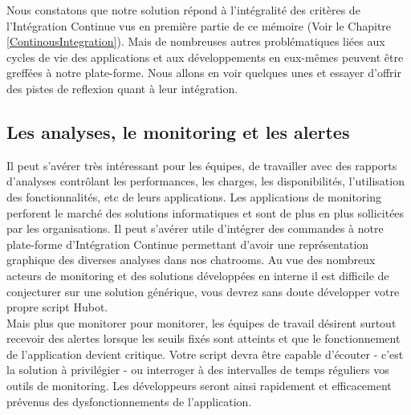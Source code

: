       Nous constatons que notre solution répond à l'intégralité des critères de l'Intégration Continue vus en première partie de ce mémoire (Voir le Chapitre \ref{ContinousIntegration}). Mais de nombreuses autres problématiques liées aux cycles de vie des applications et aux développements en eux-mêmes peuvent être greffées à notre plate-forme. Nous allons en voir quelques unes et essayer d'offrir des pistes de reflexion quant à leur intégration.

      \subsection{Les analyses, le monitoring et les alertes}
      Il peut s'avérer très intéressant pour les équipes, de travailler avec des rapports d'analyses contrôlant les performances, les charges, les disponibilités, l'utilisation des fonctionnalités, etc de leurs applications. Les applications de monitoring perforent le marché des solutions informatiques et sont de plus en plus sollicitées par les organisations. Il peut s'avérer utile d'intégrer des commandes à notre plate-forme d'Intégration Continue permettant d'avoir une représentation graphique des diverses analyses dans nos chatrooms. Au vue des nombreux acteurs de monitoring et des solutions développées en interne il est difficile de conjecturer sur une solution générique, vous devrez sans doute développer votre propre script Hubot.\\

      Mais plus que monitorer pour monitorer, les équipes de travail désirent surtout recevoir des alertes lorsque les seuils fixés sont atteints et que le fonctionnement de l'application devient critique. Votre script devra être capable d'écouter - c'est la solution à privilégier - ou interroger à des intervalles de temps réguliers vos outils de monitoring. Les développeurs seront ainsi rapidement et efficacement prévenus des dysfonctionnements de l'application.

